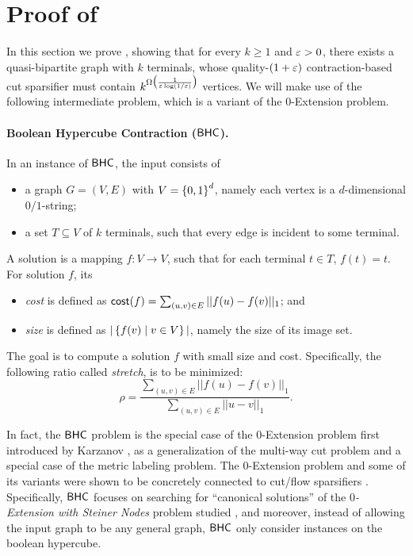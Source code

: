 \section{Proof of }
\label{sec: lower}

In this section we prove , showing that for every $k\ge 1$ and ${\varepsilon}>0$, there exists a quasi-bipartite graph with $k$ terminals, whose quality-$(1+{\varepsilon})$ contraction-based cut sparsifier must contain $k^{\Omega\big(\frac{1}{{\varepsilon} \log(1/{\varepsilon})}\big)}$ vertices. We will make use of the following intermediate problem, which is a variant of the $0$-Extension problem.

\newcommand{\bhc}{\textnormal{\textsf{BHC}}}

\paragraph{Boolean Hypercube Contraction ($\bhc$).}
In an instance of $\bhc$, the input consists of
\begin{itemize}
	\item a graph $G=(V,E)$ with $V=\left\{ 0,1 \right\}^d$, namely each vertex is a $d$-dimensional $0/1$-string;
	\item a set $T\subseteq V$ of $k$ terminals, such that every edge is incident to some terminal.
\end{itemize}
A solution is a mapping $f:V\to V$, such that for each terminal $t\in T$, $f(t)=t$. For solution $f$, its
\begin{itemize}
\item \emph{cost} is defined as $\mathsf{cost}(f)=\sum_{(u,v)\in E}||f(u)-f(v)||_1$; and
\item \emph{size} is defined as $|\left\{ f(v)\mid v\in V \right\}|$, namely the size of its image set.
\end{itemize}

The goal is to compute a solution $f$ with small size and cost. Specifically, the following ratio called \emph{stretch}, is to be minimized:
\[\rho=\frac{\sum_{(u,v)\in E}||f(u)-f(v)||_1}{\sum_{(u,v)\in E}||u-v||_1}.\]

In fact, the $\bhc$ problem is the special case of the $0$-Extension problem first introduced by Karzanov \cite{karzanov1998minimum}, as a generalization of the multi-way cut problem and a special case of the metric labeling problem.
The $0$-Extension problem and some of its variants were shown to be concretely connected to cut/flow sparsifiers \cite{moitra2009approximation,leighton2010extensions,andoni2014towards,chen2024lower,chen20241+}. Specifically, $\bhc$ focuses on searching for ``canonical solutions'' of the \emph{$0$-Extension with Steiner Nodes} problem studied \cite{chen2024lower}, and moreover, instead of allowing the input graph to be any general graph, $\bhc$ only consider instances on the boolean hypercube.


